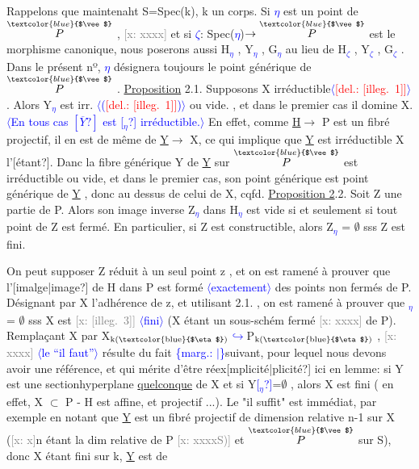\documentclass[11pt]{article}
\newcommand{\hand}[1]{\textcolor{blue}{#1}}
\let\over\relax
\newcommand{\over}[2]{\textcolor{gray}{#1}\textcolor{blue}{\ensuremath{^{\!\nearrow}}#2}}
\newcommand{\inserted}[2][]{\textcolor{blue}{$\langle$#2$\rangle$}}
\newcommand{\margin}[1]{\textcolor{blue}{\{\textsf{marg.:} #1\}}}
\newcommand{\deleted}[1]{\textcolor{red}{[\textsf{del.:} #1]}}
\newcommand{\xout}[1]{\textcolor{gray}{[\textsf{x:} #1]}}
\newcommand{\uline}[1]{\underline{#1}}
\newcommand{\unsure}[1]{[#1?]}
\newcommand{\illegible}[1]{[\textsf{illeg.\ #1}]}
\begin{document}
Rappelons que maintenaht S=Spec(k), k un corps. Si \hand{$\eta$} est un point
de $\overset{\hand{$\vee$}}{P}$ , \xout{xxxx} et si \hand{$\zeta$}: Spec(\hand{$\eta$})$\to\overset{\hand{$\vee$}}{P}$ est le morphisme canonique, nous poserons
aussi H\hand{$_\eta$} , Y\hand{$_\eta$} , G\hand{$_\eta$} au lieu de H\hand{$_\zeta$} , Y\hand{$_\zeta$} , G\hand{$_\zeta$} . Dans le présent nº, \hand{$\eta$}
désignera toujours le point générique de $\overset{\hand{$\vee$}}{P}$ .
\uline{Proposition} 2.1. Supposons X irréductible\inserted{\deleted{\illegible{1}}}. Alors Y\hand{$_\eta$} est irr. \inserted{(\deleted{\illegible{1}})} ou vide. ,
et dans le premier cas il domine X. \inserted{En tous cas $\unsure{\overline{Y}}$ est \unsure{$_\eta$} irréductible.}
En effet, comme \uline{H}$\longrightarrow$ P est un fibré projectif, il en est de même de
\uline{Y}$\longrightarrow$ X, ce qui implique que \uline{Y} est irréductible X l'\unsure{étant}. Danc la fibre
générique Y   de \uline{Y} sur $\overset{\hand{$\vee$}}{P}$ est irréductible ou vide, et dans le premier cas,
son point générique est point générique de \uline{Y} , donc au dessus de celui de
X, cqfd.
\uline{Proposition 2}.2. Soit Z une partie de P. Alors son image inverse Z\hand{$_\eta$} dans
H\hand{$_\eta$} est vide si et seulement si tout point de Z est fermé. En particulier,
si Z est constructible, alors Z\hand{$_\eta$} = $\emptyset$ sss Z est fini.

On peut supposer Z réduit à un seul point z , et on est ramené à
prouver que l'\unsure{imalge|image} de H dans P est formé \inserted[typed]{exactement} des points non fermés de P.
Désignant par X l'adhérence de z, et utilisant 2.1. , on est ramené à
prouver que \over{X}{\unsure{Y}}\hand{$_\eta$} = $\emptyset$ sss X est \xout{\illegible{3}} \inserted[typed]{fini} (X étant un sous-schém%
fermé \xout{xxxx} de P). Remplaçant X par X$_{\text{k(\hand{$\eta$})}}$\hand{$\hookrightarrow$}P$_{\text{k(\hand{$\eta$})}}$ , \xout{xxxx} \inserted[typed]{le ``il faut''} résulte du fait
\margin{$|$}suivant, pour lequel nous devons avoir une référence, et qui mérite d'être
réex\unsure{mplicité|plicité} ici en lemme: si Y est une sectionhyperplane \uline{quelconque} de
X et si Y\hand{\unsure{$_\eta$}}=$\emptyset$ , alors X est fini ( en effet, X $\subset$ P - H est affine, et
projectif ...). Le "il suffit" est immédiat, par exemple en notant que
\uline{Y} est un fibré projectif de dimension relative n-1 sur X (\xout{x}n étant la
dim relative de P \xout{xxxxS)} et $\overset{\hand{$\vee$}}{P}$ sur S), donc X étant fini sur k, \uline{Y} est de
\end{document}
